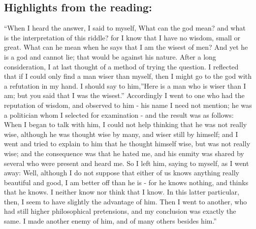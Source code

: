 \documentclass[
]{book}
\begin{document}
\hypertarget{highlights-from-the-reading-1}{%
\subsection{Highlights from the reading:}\label{highlights-from-the-reading-1}}

``When I heard the answer, I said to myself, What can the god mean? and what is the interpretation of this riddle? for I know that I have no wisdom, small or great. What can he mean when he says that I am the wisest of men? And yet he is a god and cannot lie; that would be against his nature. After a long consideration, I at last thought of a method of trying the question. I reflected that if I could only find a man wiser than myself, then I might go to the god with a refutation in my hand. I should say to him,''Here is a man who is wiser than I am; but you said that I was the wisest.'' Accordingly I went to one who had the reputation of wisdom, and observed to him - his name I need not mention; he was a politician whom I selected for examination - and the result was as follows: When I began to talk with him, I could not help thinking that he was not really wise, although he was thought wise by many, and wiser still by himself; and I went and tried to explain to him that he thought himself wise, but was not really wise; and the consequence was that he hated me, and his enmity was shared by several who were present and heard me. So I left him, saying to myself, as I went away: Well, although I do not suppose that either of us knows anything really beautiful and good, I am better off than he is - for he knows nothing, and thinks that he knows. I neither know nor think that I know. In this latter particular, then, I seem to have slightly the advantage of him. Then I went to another, who had still higher philosophical pretensions, and my conclusion was exactly the same. I made another enemy of him, and of many others besides him.''
\end{document}
